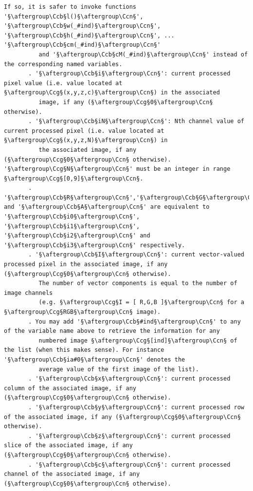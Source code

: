 \documentclass[a4paper,10.5pt,twoside]{book}
\def\Ccb{\color{cb}}
\def\Ccg{\color{cc}}
\def\Ccn{\color{black}}
\begin{document}
\begin{lstlisting}[escapechar=§]
          If so, it is safer to invoke functions '§\aftergroup\Ccb§l()§\aftergroup\Ccn§', '§\aftergroup\Ccb§w(_#ind)§\aftergroup\Ccn§', '§\aftergroup\Ccb§h(_#ind)§\aftergroup\Ccn§', ... '§\aftergroup\Ccb§cm(_#ind)§\aftergroup\Ccn§' 
          and '§\aftergroup\Ccb§cM(_#ind)§\aftergroup\Ccn§' instead of the corresponding named variables. 
       . '§\aftergroup\Ccb§i§\aftergroup\Ccn§': current processed pixel value (i.e. value located at §\aftergroup\Ccg§(x,y,z,c)§\aftergroup\Ccn§) in the associated 
          image, if any (§\aftergroup\Ccg§0§\aftergroup\Ccn§ otherwise). 
       . '§\aftergroup\Ccb§iN§\aftergroup\Ccn§': Nth channel value of current processed pixel (i.e. value located at §\aftergroup\Ccg§(x,y,z,N)§\aftergroup\Ccn§) in 
          the associated image, if any (§\aftergroup\Ccg§0§\aftergroup\Ccn§ otherwise). '§\aftergroup\Ccg§N§\aftergroup\Ccn§' must be an integer in range §\aftergroup\Ccg§[0,9]§\aftergroup\Ccn§. 
       . '§\aftergroup\Ccb§R§\aftergroup\Ccn§','§\aftergroup\Ccb§G§\aftergroup\Ccn§','§\aftergroup\Ccb§B§\aftergroup\Ccn§' and '§\aftergroup\Ccb§A§\aftergroup\Ccn§' are equivalent to '§\aftergroup\Ccb§i0§\aftergroup\Ccn§', '§\aftergroup\Ccb§i1§\aftergroup\Ccn§', '§\aftergroup\Ccb§i2§\aftergroup\Ccn§' and '§\aftergroup\Ccb§i3§\aftergroup\Ccn§' respectively. 
       . '§\aftergroup\Ccb§I§\aftergroup\Ccn§': current vector-valued processed pixel in the associated image, if any (§\aftergroup\Ccg§0§\aftergroup\Ccn§ otherwise). 
          The number of vector components is equal to the number of image channels 
          (e.g. §\aftergroup\Ccg§I = [ R,G,B ]§\aftergroup\Ccn§ for a §\aftergroup\Ccg§RGB§\aftergroup\Ccn§ image). 
       . You may add '§\aftergroup\Ccb§#ind§\aftergroup\Ccn§' to any of the variable name above to retrieve the information for any 
          numbered image §\aftergroup\Ccg§[ind]§\aftergroup\Ccn§ of the list (when this makes sense). For instance '§\aftergroup\Ccb§ia#0§\aftergroup\Ccn§' denotes the 
          average value of the first image of the list). 
       . '§\aftergroup\Ccb§x§\aftergroup\Ccn§': current processed column of the associated image, if any (§\aftergroup\Ccg§0§\aftergroup\Ccn§ otherwise). 
       . '§\aftergroup\Ccb§y§\aftergroup\Ccn§': current processed row of the associated image, if any (§\aftergroup\Ccg§0§\aftergroup\Ccn§ otherwise). 
       . '§\aftergroup\Ccb§z§\aftergroup\Ccn§': current processed slice of the associated image, if any (§\aftergroup\Ccg§0§\aftergroup\Ccn§ otherwise). 
       . '§\aftergroup\Ccb§c§\aftergroup\Ccn§': current processed channel of the associated image, if any (§\aftergroup\Ccg§0§\aftergroup\Ccn§ otherwise). 

\end{lstlisting}
\end{document}
